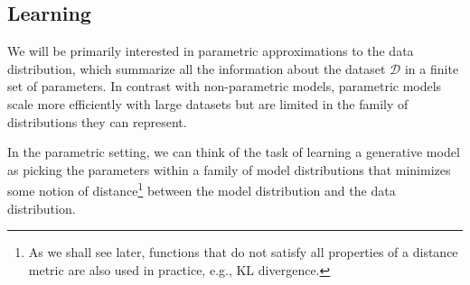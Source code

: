 \subsection{Learning}

We will be primarily interested in parametric approximations to the data
distribution, which summarize all the information about the dataset $\mathcal{D}$ in
a finite set of parameters. In contrast with non-parametric models,
parametric models scale more efficiently with large datasets but are
limited in the family of distributions they can represent.

In the parametric setting, we can think of the task of learning a
generative model as picking the parameters within a family of model
distributions that minimizes some notion of distance\footnote{
  As we shall see later, functions that do not satisfy all 
  properties of a distance metric are also used in practice, e.g., KL
  divergence.} 
between the model distribution and the data distribution.

